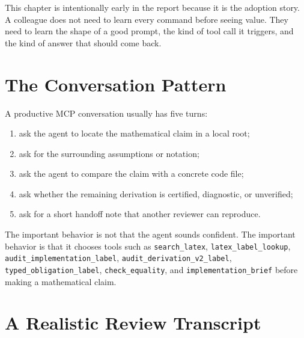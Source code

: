 \documentclass[12pt,a4paper,openany]{book}
\begin{document}
This chapter is intentionally early in the report because it is the adoption
story. A colleague does not need to learn every command before seeing value.
They need to learn the shape of a good prompt, the kind of tool call it
triggers, and the kind of answer that should come back.

\section{The Conversation Pattern}

A productive MCP conversation usually has five turns:

\begin{enumerate}[label=\arabic*.]
  \item ask the agent to locate the mathematical claim in a local root;
  \item ask for the surrounding assumptions or notation;
  \item ask the agent to compare the claim with a concrete code file;
  \item ask whether the remaining derivation is certified, diagnostic, or
        unverified;
  \item ask for a short handoff note that another reviewer can reproduce.
\end{enumerate}

The important behavior is not that the agent sounds confident. The important
behavior is that it chooses tools such as \texttt{search\_latex},
\texttt{latex\_label\_lookup}, \texttt{audit\_implementation\_label},
\texttt{audit\_derivation\_v2\_label}, \texttt{typed\_obligation\_label},
\texttt{check\_equality}, and \texttt{implementation\_brief} before making a
mathematical claim.

\section{A Realistic Review Transcript}
\end{document}
